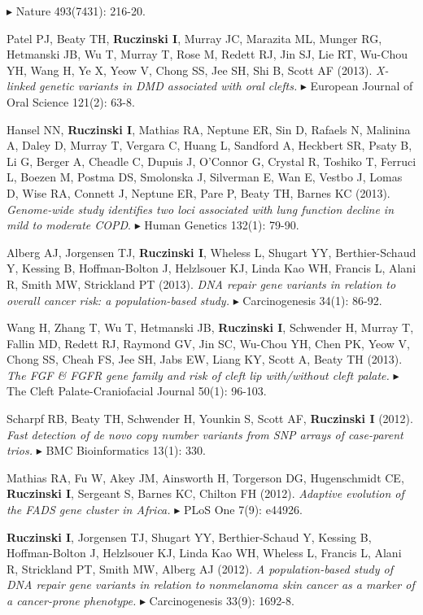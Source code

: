 \documentclass[10pt]{article}
\newcommand{\mine}{
  \addtocounter{enumi}{1}
\item[\fcolorbox{white}{grey}{\color{white} \tiny \arabic{enumi}}]
}
\newcommand{\dg}[1]{{\color{black} $\blacktriangleright$ {#1}}}
\begin{document}
\dg{Nature 493(7431): 216-20.}
\item 
Patel PJ, Beaty TH, {\bf Ruczinski I}, Murray JC, Marazita ML, Munger RG, Hetmanski JB, Wu T, Murray T, Rose M, Redett RJ, Jin SJ, Lie RT, Wu-Chou YH, Wang H, Ye X, Yeow V, Chong SS, Jee SH, Shi B, Scott AF (2013).
{\it X-linked genetic variants in DMD associated with oral clefts.}
\dg{European Journal of Oral Science 121(2): 63-8.}
\item 
Hansel NN, {\bf Ruczinski I}, Mathias RA, Neptune ER, Sin D, Rafaels N, Malinina A, Daley D, Murray T, Vergara C, Huang L, Sandford A, Heckbert SR, Psaty B, Li G, Berger A, Cheadle C, Dupuis J, O'Connor G, Crystal R, Toshiko T, Ferruci L, Boezen M, Postma DS, Smolonska J, Silverman E, Wan E, Vestbo J, Lomas D, Wise RA, Connett J, Neptune ER, Pare P, Beaty TH, Barnes KC (2013).
{\it Genome-wide study identifies two loci associated with lung function decline in mild to moderate COPD}. 
\dg{Human Genetics 132(1): 79-90.}
\item 
Alberg AJ, Jorgensen TJ, {\bf Ruczinski I}, Wheless L, Shugart YY, Berthier-Schaud Y, Kessing B, Hoffman-Bolton J, Helzlsouer KJ, Linda Kao WH, Francis L, Alani R, Smith MW, Strickland PT (2013).
{\it DNA repair gene variants in relation to overall cancer risk: a population-based study.}
\dg{Carcinogenesis 34(1): 86-92}. 
\item
Wang H, Zhang T, Wu T, Hetmanski JB, {\bf Ruczinski I}, Schwender H, Murray T, Fallin MD, Redett RJ, Raymond GV, Jin SC, Wu-Chou YH, Chen PK, Yeow V, Chong SS, Cheah FS, Jee SH, Jabs EW, Liang KY, Scott A, Beaty TH (2013).
{\it The FGF \& FGFR gene family and risk of cleft lip with/without cleft palate.}
\dg{The Cleft Palate-Craniofacial Journal 50(1): 96-103.}
\mine 
Scharpf RB, Beaty TH, Schwender H, Younkin S, Scott AF, {\bf Ruczinski I} (2012).
{\it Fast detection of de novo copy number variants from SNP arrays of case-parent trios.}
\dg{BMC Bioinformatics 13(1): 330.}
\item
Mathias RA, Fu W, Akey JM, Ainsworth H, Torgerson DG, Hugenschmidt CE, {\bf Ruczinski I}, Sergeant S, Barnes KC, Chilton FH (2012).
{\it Adaptive evolution of the FADS gene cluster in Africa.}
\dg{PLoS One 7(9): e44926.}
\mine 
{\bf Ruczinski I}, Jorgensen TJ, Shugart YY, Berthier-Schaud Y, Kessing B, Hoffman-Bolton J, Helzlsouer KJ, Linda Kao WH, Wheless L, Francis L, Alani R, Strickland PT, Smith MW, Alberg AJ (2012). 
{\it A population-based study of DNA repair gene variants in relation to nonmelanoma skin cancer as a marker of a cancer-prone phenotype.}
\dg{Carcinogenesis 33(9): 1692-8.}
\end{document}

